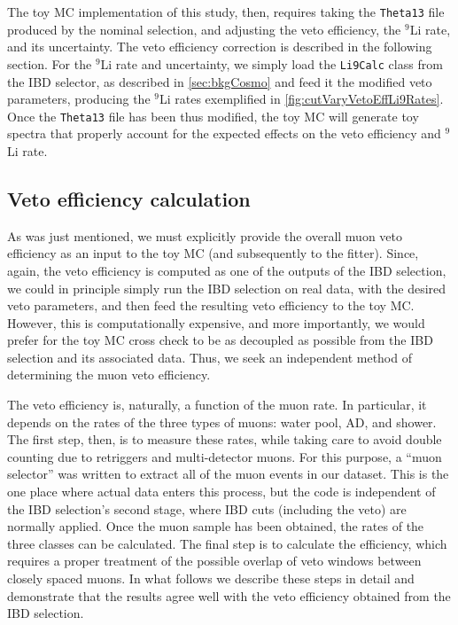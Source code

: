 \documentclass[../thesis.tex]{subfiles}
\begin{document}
The toy MC implementation of this study, then, requires taking the \texttt{Theta13} file produced by the nominal selection, and adjusting the veto efficiency, the $^9$Li rate, and its uncertainty. The veto efficiency correction is described in the following section. For the $^9$Li rate and uncertainty, we simply load the \texttt{Li9Calc} class from the IBD selector, as described in \autoref{sec:bkgCosmo} and feed it the modified veto parameters, producing the $^9$Li rates exemplified in \autoref{fig:cutVaryVetoEffLi9Rates}. Once the \texttt{Theta13} file has been thus modified, the toy MC will generate toy spectra that properly account for the expected effects on the veto efficiency and $^9$Li rate.

\subsection{Veto efficiency calculation}%
\label{sec:cutVaryMuVetoEff}

As was just mentioned, we must explicitly provide the overall muon veto efficiency as an input to the toy MC (and subsequently to the fitter). Since, again, the veto efficiency is computed as one of the outputs of the IBD selection, we could in principle simply run the IBD selection on real data, with the desired veto parameters, and then feed the resulting veto efficiency to the toy MC. However, this is computationally expensive, and more importantly, we would prefer for the toy MC cross check to be as decoupled as possible from the IBD selection and its associated data. Thus, we seek an independent method of determining the muon veto efficiency.

The veto efficiency is, naturally, a function of the muon rate. In particular, it depends on the rates of the three types of muons: water pool, AD, and shower. The first step, then, is to measure these rates, while taking care to avoid double counting due to retriggers and multi-detector muons. For this purpose, a ``muon selector'' was written to extract all of the muon events in our dataset. This is the one place where actual data enters this process, but the code is independent of the IBD selection's second stage, where IBD cuts (including the veto) are normally applied. Once the muon sample has been obtained, the rates of the three classes can be calculated. The final step is to calculate the efficiency, which requires a proper treatment of the possible overlap of veto windows between closely spaced muons. In what follows we describe these steps in detail and demonstrate that the results agree well with the veto efficiency obtained from the IBD selection.
\end{document}
